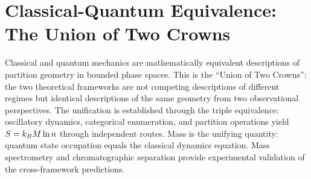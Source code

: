 \chapter{Classical-Quantum Equivalence: The Union of Two Crowns}
\label{ch:union_crowns}


\begin{chapterabstract}
Classical and quantum mechanics are mathematically equivalent descriptions of partition geometry in bounded phase spaces. This is the ``Union of Two Crowns'': the two theoretical frameworks are not competing descriptions of different regimes but identical descriptions of the same geometry from two observational perspectives. The unification is established through the triple equivalence: oscillatory dynamics, categorical enumeration, and partition operations yield $S = k_B M \ln n$ through independent routes. Mass is the unifying quantity: quantum state occupation equals the classical dynamics equation. Mass spectrometry and chromatographic separation provide experimental validation of the cross-framework predictions.
\end{chapterabstract}



